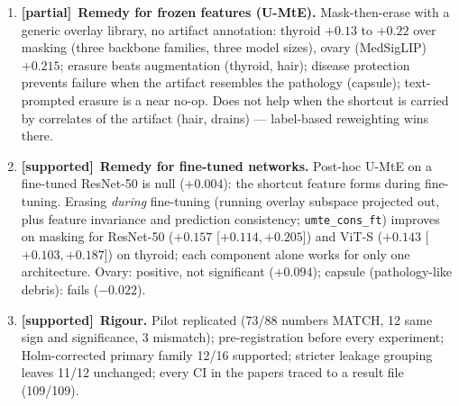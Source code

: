 \documentclass[10pt,a4paper]{article}
\newcommand{\ok}{\textcolor{green!50!black}{\textbf{[supported]}}}
\newcommand{\mixed}{\textcolor{orange!80!black}{\textbf{[partial]}}}
\begin{document}
\begin{enumerate}[leftmargin=*]
heuristic $2\cdot$clean$-$corr, and the sweep mask gains in 42/45 signs (heuristic 36/45). The crossover correlation
(r = 0.997) is \emph{not} evidence for the model: the heuristic reaches r = 0.989. Pre-registered verdict: ``qualitative
account'' (one near-zero sign miss). Fails for chest drains. It anticipates DermLIP's missing hair gap ($-0.003$ vs
$-0.002$).
\item \mixed\ \textbf{Remedy for frozen features (U-MtE).} Mask-then-erase with a generic overlay library, no artifact
annotation: thyroid $+0.13$ to $+0.22$ over masking (three backbone families, three model sizes), ovary (MedSigLIP)
$+0.215$; erasure beats augmentation (thyroid, hair); disease protection prevents failure when the artifact resembles
the pathology (capsule); text-prompted erasure is a near no-op. Does not help when the shortcut is carried by correlates of
the artifact (hair, drains) --- label-based reweighting wins there.
\item \ok\ \textbf{Remedy for fine-tuned networks.} Post-hoc U-MtE on a fine-tuned ResNet-50 is null ($+0.004$): the
shortcut feature forms during fine-tuning. Erasing \emph{during} fine-tuning (running overlay subspace projected out,
plus feature invariance and prediction consistency; \texttt{umte\_cons\_ft}) improves on masking for ResNet-50
($+0.157$ [$+0.114,+0.205$]) and ViT-S ($+0.143$ [$+0.103,+0.187$]) on thyroid; each component alone works for only one
architecture. Ovary: positive, not significant ($+0.094$); capsule (pathology-like debris): fails ($-0.022$).
\item \ok\ \textbf{Rigour.} Pilot replicated (73/88 numbers MATCH, 12 same sign and significance, 3 mismatch);
pre-registration before every experiment; Holm-corrected primary family 12/16 supported; stricter leakage grouping
leaves 11/12 unchanged; every CI in the papers traced to a result file (109/109).
\end{enumerate}
\end{document}
